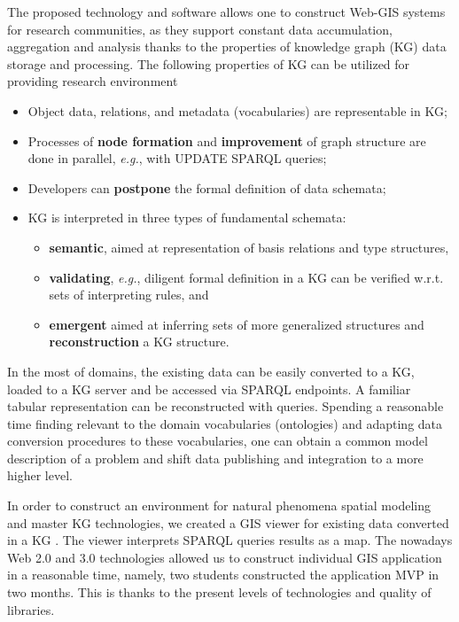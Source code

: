 \documentclass[
]{ceurart}
\begin{document}
The proposed technology and software allows one to construct Web-GIS systems for research communities, as they support constant data accumulation, aggregation and analysis thanks to the properties of knowledge graph (KG) data storage and processing.  The following properties of KG can be utilized for providing research environment
 \begin{itemize}
  \item Object data, relations, and metadata (vocabularies) are representable in KG;
  \item Processes of \textbf{node formation} and \textbf{improvement} of graph structure are done in parallel, \emph{e.g.}, with UPDATE SPARQL queries;
  \item Developers can \textbf{postpone} the formal definition of data schemata;
  \item KG is interpreted in three types of fundamental schemata:
    \begin{itemize}
    \item \textbf{semantic}, aimed at representation of basis relations and type structures,
    \item \textbf{validating}, \emph{e.g.}, diligent formal definition in a KG can be verified w.r.t. sets of interpreting rules, and
    \item \textbf{emergent} aimed at inferring sets of more generalized structures and \textbf{reconstruction} a KG structure.
    \end{itemize}
  \end{itemize}

In the most of domains, the existing data can be easily converted to a KG, loaded to a KG server and be accessed via SPARQL endpoints.  A familiar tabular representation can be reconstructed with queries.  Spending a reasonable time finding relevant to the domain vocabularies (ontologies) and adapting data conversion procedures to these vocabularies, one can obtain a common model description of a problem and shift data publishing and integration to a more higher level.

In order to construct an environment for natural phenomena spatial modeling and master KG technologies, we created a GIS viewer for existing data converted in a KG \cite{lunina}.  The viewer interprets SPARQL queries results as a map.  The nowadays Web 2.0 and 3.0 technologies allowed us to construct individual GIS application in a reasonable time, namely, two students constructed the application MVP in two months.  This is thanks to the present levels of technologies and quality of libraries.
\end{document}
